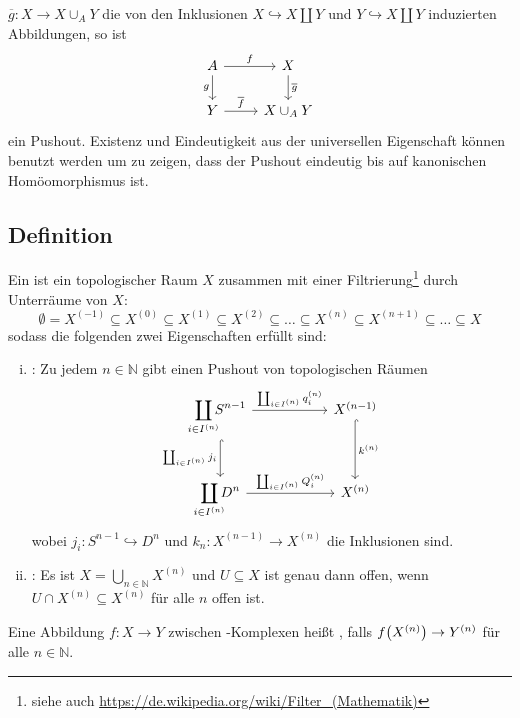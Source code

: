 $\overline{g}\colon X \to X \cup_A Y$ die von den Inklusionen $X \hookrightarrow X \coprod Y$ und $Y \hookrightarrow X \coprod Y$ induzierten Abbildungen, so ist 
\[
	\begin{tikzcd}[]
		A \rar["f"] \dar["g"'] & X \dar["\overline{g}"] \\
		Y \rar["\overline{f}"] & X \cup_A Y
	\end{tikzcd}
\]
ein Pushout. 
Existenz und Eindeutigkeit aus der universellen Eigenschaft können benutzt werden um zu zeigen, dass der Pushout eindeutig bis auf kanonischen Homöomorphismus ist.

\subsection[Definition: \CW-Komplex]{Definition} %
\label{sub:112}
Ein  ist ein topologischer Raum $X$ zusammen mit einer Filtrierung\footnote{siehe auch \url{https://de.wikipedia.org/wiki/Filter_(Mathematik)}} durch Unterräume von $X$: 
\[
	\emptyset = X^{(-1)} \subseteq X^{(0)} \subseteq X^{(1)} \subseteq X^{(2)} \subseteq  \ldots \subseteq X^{(n)} \subseteq X^{(n+1)} \subseteq \ldots \subseteq X
\]
sodass die folgenden zwei Eigenschaften erfüllt sind:
\begin{enumerate}[(i)]
	\item {}: Zu jedem $n \in \mathds{N}$ gibt einen Pushout von topologischen Räumen 
	\[
		\begin{tikzcd}[row sep = large, column sep = 5.4em]
			\smashoperator{\coprod\limits_{i \in I^{(n)}}} S^{n-1} \rar["\coprod_{i \in I^{(n)}} q_i^{(n)}"] \dar["\coprod_{i \in I^{(n)}} j_i"', hook] 
			& X^{(n-1)} \dar[hook, "k^{(n)}"] \\
			\smashoperator{\coprod\limits_{i \in I^{(n)}}} D^n \rar["\coprod_{i \in I^{(n)}} Q_i^{(n)}"] & X^{(n)}
		\end{tikzcd}
	\]
	wobei $j_i \colon S^{n-1} \hookrightarrow D^n$ und $k_n \colon X^{(n-1)} \to X^{(n)}$ die Inklusionen sind.
	\item {}: Es ist $X= \bigcup_{n \in \mathds{N}} X^{(n)}$ und $U \subseteq X$ ist genau dann offen, wenn $U \cap X^{(n)} \subseteq X^{(n)}$ für 
	alle $n$ offen ist.
\end{enumerate}
Eine Abbildung $f \colon X \to Y$ zwischen \CW-Komplexen heißt , falls $f \enbrace*{X^{(n)}} \to Y^{(n)}$ für alle $n \in \mathds{N}$. 


